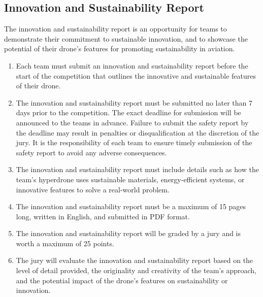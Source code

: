     \subsection{Innovation and Sustainability Report}
    The innovation and sustainability report is an opportunity for teams to demonstrate their commitment to sustainable innovation, and to showcase the potential of their drone's features for promoting sustainability in aviation.
    \begin{enumerate}
    \item Each team must submit an innovation and sustainability report before the start of the competition that outlines the innovative and sustainable features of their drone.
    \item The innovation and sustainability report must be submitted no later than 7 days prior to the competition. The exact deadline for submission will be announced to the teams in advance. Failure to submit the safety report by the deadline may result in penalties or disqualification at the discretion of the jury. It is the responsibility of each team to ensure timely submission of the safety report to avoid any adverse consequences.
    \item The innovation and sustainability report must include details such as how the team's hyperdrone uses sustainable materials, energy-efficient systems, or innovative features to solve a real-world problem.
    \item The innovation and sustainability report must be a maximum of 15 pages long, written in English, and submitted in PDF format.
    \item The innovation and sustainability report will be graded by a jury and is worth a maximum of 25 points.
    \item The jury will evaluate the innovation and sustainability report based on the level of detail provided, the originality and creativity of the team's approach, and the potential impact of the drone's features on sustainability or innovation.
    \end{enumerate}
    
